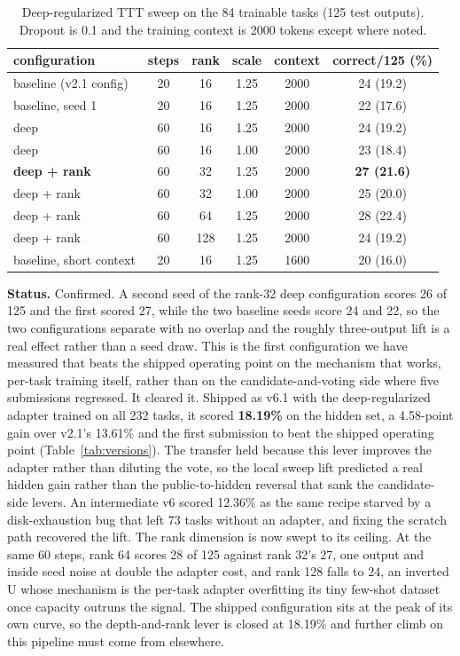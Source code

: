 \documentclass[11pt]{article}
\begin{document}
\begin{table}[H]
\centering
\caption{Deep-regularized TTT sweep on the 84 trainable tasks (125 test outputs). Dropout is 0.1 and the
training context is 2000 tokens except where noted.}
\label{tab:deepttt}
\begin{tabular}{lccccc}
\toprule
configuration & steps & rank & scale & context & correct/125 (\%) \\
\midrule
baseline (v2.1 config)  & 20 & 16 & 1.25 & 2000 & 24 (19.2) \\
baseline, seed 1        & 20 & 16 & 1.25 & 2000 & 22 (17.6) \\
deep                    & 60 & 16 & 1.25 & 2000 & 24 (19.2) \\
deep                    & 60 & 16 & 1.00 & 2000 & 23 (18.4) \\
\textbf{deep + rank}    & 60 & 32 & 1.25 & 2000 & \textbf{27 (21.6)} \\
deep + rank             & 60 & 32 & 1.00 & 2000 & 25 (20.0) \\
deep + rank             & 60 & 64 & 1.25 & 2000 & 28 (22.4) \\
deep + rank             & 60 & 128 & 1.25 & 2000 & 24 (19.2) \\
baseline, short context & 20 & 16 & 1.25 & 1600 & 20 (16.0) \\
\bottomrule
\end{tabular}
\end{table}

\textbf{Status.} Confirmed. A second seed of the rank-32 deep configuration scores 26 of 125 and the
first scored 27, while the two baseline seeds score 24 and 22, so the two configurations separate with no
overlap and the roughly three-output lift is a real effect rather than a seed draw. This is the first
configuration we have measured that beats the shipped operating point on the mechanism that works,
per-task training itself, rather than on the candidate-and-voting side where five submissions regressed.
It cleared it. Shipped as v6.1 with the deep-regularized adapter trained on all 232 tasks, it scored
\textbf{18.19\%} on the hidden set, a 4.58-point gain over v2.1's 13.61\% and the first submission to beat
the shipped operating point (Table~\ref{tab:versions}). The transfer held because this lever improves the
adapter rather than diluting the vote, so the local sweep lift predicted a real hidden gain rather than the
public-to-hidden reversal that sank the candidate-side levers. An intermediate v6 scored 12.36\% as the same
recipe starved by a disk-exhaustion bug that left 73 tasks without an adapter, and fixing the scratch path
recovered the lift. The rank dimension is now swept to its ceiling. At the same 60 steps, rank 64 scores 28
of 125 against rank 32's 27, one output and inside seed noise at double the adapter cost, and rank 128 falls
to 24, an inverted U whose mechanism is the per-task adapter overfitting its tiny few-shot dataset once
capacity outruns the signal. The shipped configuration sits at the peak of its own curve, so the depth-and-rank
lever is closed at 18.19\% and further climb on this pipeline must come from elsewhere.
\end{document}

